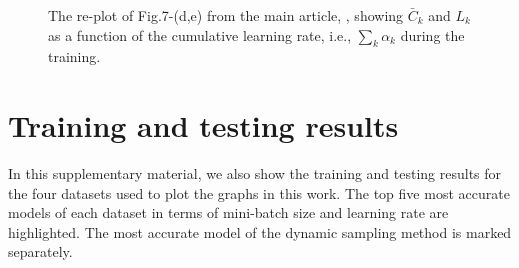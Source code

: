 \documentclass[10pt,journal,compsoc]{IEEEtran}
\begin{document}
\begin{figure*}
\begin{center}
\end{center}
\caption{The re-plot of Fig.7-(d,e) from the main article, , showing $\bar C_k$ and $L_k$ as a function of the cumulative learning rate, i.e., $\sum_k \alpha_k$ during the training.}
\label{fig:m2lp_iterlr}
\end{figure*}



\section{Training and testing results}
In this supplementary material, we also show the training and testing results for the four datasets used to plot the graphs in this work.
The top five most accurate models of each dataset in terms of mini-batch size and learning rate are highlighted.
The most accurate model of the dynamic sampling method is marked separately.

\FloatBarrier
\end{document}
